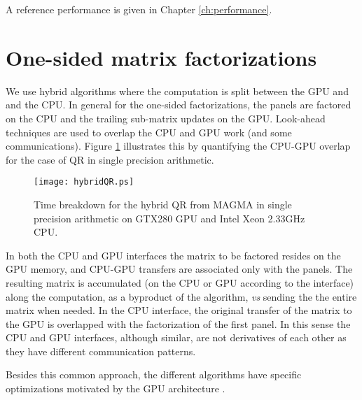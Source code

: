 \documentclass[10pt]{book}
\begin{document}
\vspace{0.1in}
A reference performance is given in Chapter \ref{ch:performance}. 




\newpage
\section{One-sided matrix factorizations}

\vspace{0.1in}
We use hybrid algorithms where the computation is split between the GPU
and and the CPU. In general for the one-sided factorizations,
the panels are factored on the CPU and the trailing sub-matrix updates
on the GPU. Look-ahead techniques are used to overlap the CPU and GPU
work (and some communications). Figure \ref{time-break-QR} illustrates this
by quantifying the CPU-GPU overlap for the case of QR in single precision 
arithmetic.

\vspace{0.1in}
\begin{figure}[!ht]
   \centering
   \texttt{[image: hybridQR.ps]}
   \caption{Time breakdown for the hybrid QR from MAGMA in single precision 
            arithmetic on GTX280 GPU and Intel Xeon 2.33GHz CPU.}
   \label{time-break-QR}
\end{figure}

\vspace{0.1in}
In both the CPU and GPU interfaces the matrix to be factored resides on the
GPU memory, and CPU-GPU transfers are associated only with the panels.
The resulting matrix is accumulated (on the CPU or GPU according to the 
interface) along the computation, as a byproduct of the algorithm, {\it vs}
sending the the entire matrix when needed. In the CPU interface, the original
transfer of the matrix to the GPU is overlapped with the factorization of the
first panel. In this sense the CPU and GPU interfaces, although similar,
are not derivatives of each other as they have different communication patterns.

\vspace{0.1in}
Besides this common approach, the different algorithms have specific 
optimizations motivated by the GPU architecture 
\cite{lawn210,VolkovSC}.


\footnotesize
\newpage
\end{document}
